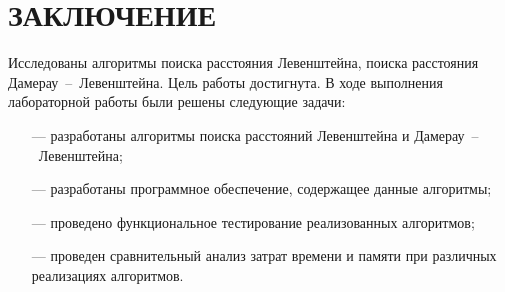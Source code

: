 \chapter*{\hfill{\centering \MakeUppercase{Заключение}}\hfill}

Исследованы алгоритмы поиска расстояния Левенштейна, поиска расстояния Дамерау~--~Левенштейна. Цель работы достигнута. В ходе выполнения лабораторной работы были решены следующие задачи:

\begin{itemize}
	\item[---] разработаны алгоритмы поиска расстояний Левенштейна и Дамерау~--~Левенштейна;
	\item[---] разработаны программное обеспечение, содержащее данные алгоритмы;
	\item[---] проведено функциональное тестирование реализованных алгоритмов;
	\item[---] проведен сравнительный анализ затрат времени и памяти при различных реализациях алгоритмов.
\end{itemize}
